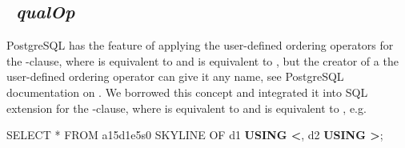 %
%
%
%
%

\subsection{~\emph{qualOp}}
\label{sec:using-qualop}
PostgreSQL has the feature of applying the user-defined ordering operators for
the -clause, where  is equivalent to
 and  is equivalent to , 
but the creator of a the user-defined ordering operator can give it
any name, see PostgreSQL documentation on
.  We
borrowed this concept and integrated it into SQL extension for the
-clause, where  is equivalent to
 and  is equivalent to
, e.g.

\begin{sql}
SELECT * FROM a15d1e5s0 SKYLINE OF d1 \textbf{USING <}, d2 \textbf{USING >};
\end{sql}


